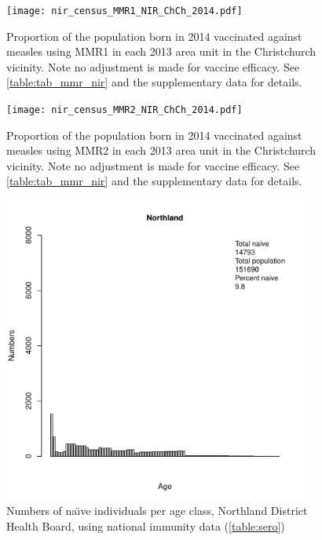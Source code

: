 \documentclass{article}
\begin{document}
\begin{figure}
\begin{center}
    \texttt{[image: nir\_census\_MMR1\_NIR\_ChCh\_2014.pdf]}
 \end{center}
    \caption{Proportion of the population born in 2014 vaccinated against measles using MMR1 in each 2013 area unit in the Christchurch vicinity. Note no adjustment is made for vaccine efficacy. See \autoref{table:tab_mmr_nir} and the supplementary data for details.}
\label{fig:fig12014_c}
\end{figure}

\begin{figure}
\begin{center}
    \texttt{[image: nir\_census\_MMR2\_NIR\_ChCh\_2014.pdf]}
 \end{center}
    \caption{Proportion of the population born in 2014 vaccinated against measles using MMR2 in each 2013 area unit in the Christchurch vicinity. Note no adjustment is made for vaccine efficacy. See \autoref{table:tab_mmr_nir} and the supplementary data for details.}
\label{fig:fig22014_c}
\end{figure}

\begin{figure}[H]
     \begin{center}
     \includegraphics[width=0.9\textwidth]{dhb1.pdf}
     \end{center}
     \caption{Numbers of na\"{\i}ve individuals per age class, Northland District Health Board, using national immunity data (\autoref{table:sero})}
     \label{fig:Northland}
\end{figure}
\end{document}
